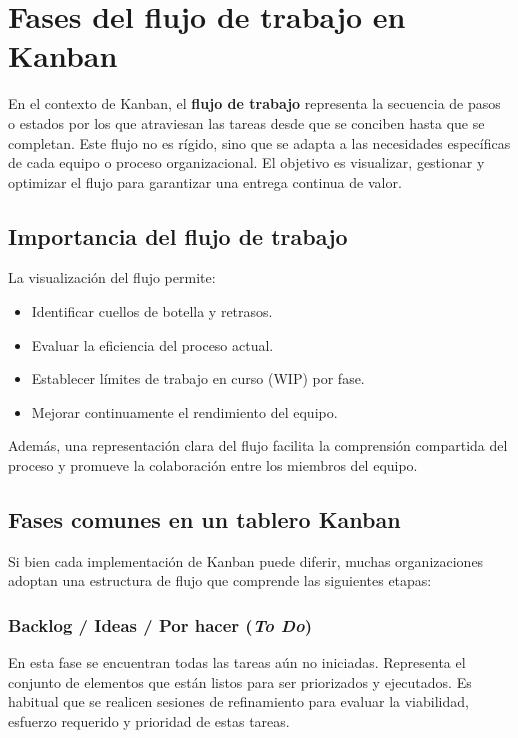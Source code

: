 \section{Fases del flujo de trabajo en Kanban}

En el contexto de Kanban, el \textbf{flujo de trabajo} representa la secuencia de pasos o estados por los que atraviesan las tareas desde que se conciben hasta que se completan. Este flujo no es rígido, sino que se adapta a las necesidades específicas de cada equipo o proceso organizacional. El objetivo es visualizar, gestionar y optimizar el flujo para garantizar una entrega continua de valor.

\subsection{Importancia del flujo de trabajo}

La visualización del flujo permite:
\begin{itemize}
    \item Identificar cuellos de botella y retrasos.
    \item Evaluar la eficiencia del proceso actual.
    \item Establecer límites de trabajo en curso (WIP) por fase.
    \item Mejorar continuamente el rendimiento del equipo.
\end{itemize}

Además, una representación clara del flujo facilita la comprensión compartida del proceso y promueve la colaboración entre los miembros del equipo.

\subsection{Fases comunes en un tablero Kanban}

Si bien cada implementación de Kanban puede diferir, muchas organizaciones adoptan una estructura de flujo que comprende las siguientes etapas:

\subsubsection{Backlog / Ideas / Por hacer (\textit{To Do})}

En esta fase se encuentran todas las tareas aún no iniciadas. Representa el conjunto de elementos que están listos para ser priorizados y ejecutados. Es habitual que se realicen sesiones de refinamiento para evaluar la viabilidad, esfuerzo requerido y prioridad de estas tareas.

